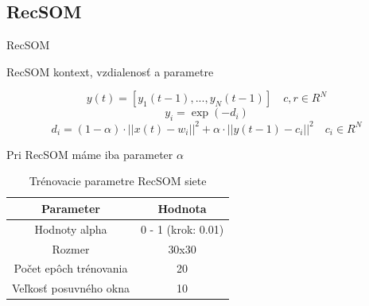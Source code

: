 \documentclass[10pt]{beamer}
\begin{document}
\subsection{RecSOM}
\begin{frame}[fragile]{RecSOM}

  \begin{block}{RecSOM kontext, vzdialenosť a parametre}
    
    \begin{equation*}
      y(t) = [y_1(t-1), ..., y_{N}(t-1)]  \quad c, r \in R^{N}
    \end{equation*}
    \begin{equation*}
      y_i = \exp(-d_i)
    \end{equation*}
    \begin{equation*}
      d_i = (1 - \alpha) \cdot ||x(t) - w_i||^{2} + \alpha \cdot ||y(t-1) - c_i||^{2} \quad c_{i} \in R^{N}
    \end{equation*}

    Pri RecSOM máme iba parameter $\alpha$
    
  \end{block}

  \begin{table}[h!]
    \centering
    \begin{tabular}{|c|c|} 
     \hline
     Parameter & Hodnota \\ 
     \hline\hline
     Hodnoty alpha & 0 - 1  (krok: 0.01) \\ 
     \hline
     Rozmer & 30x30  \\
     \hline
     Počet epôch trénovania & 20 \\
     \hline
     Veľkosť posuvného okna & 10  \\
     \hline
    \end{tabular}
    \caption{Trénovacie parametre RecSOM siete}
    \end{table}

\end{frame}
\end{document}

